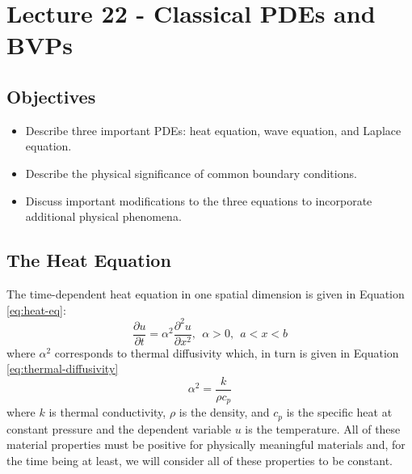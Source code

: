 \chapter{Lecture 22 - Classical PDEs and BVPs}
\label{ch:lec22}
\section{Objectives}
\begin{itemize}
\item Describe three important PDEs: heat equation, wave equation, and Laplace equation.
\item Describe the physical significance of common boundary conditions.
\item Discuss important modifications to the three equations to incorporate additional physical phenomena.
\end{itemize}

\section{The Heat Equation}
The time-dependent heat equation in one spatial dimension is given in Equation \ref{eq:heat-eq}:
\begin{equation}
\frac{\partial u}{\partial t} = \alpha^2\frac{\partial^2 u}{\partial x^2}, \ \ \alpha > 0, \ \ a<x<b
\label{eq:heat-eq}
\end{equation}
where $\alpha^2$ corresponds to thermal diffusivity which, in turn is given in Equation \ref{eq:thermal-diffusivity}
\begin{equation}
\alpha^2 = \frac{k}{\rho c_p}
\label{eq:thermal-diffusivity}
\end{equation}
where $k$ is thermal conductivity, $\rho$ is the density, and $c_p$ is the specific heat at constant pressure and the dependent variable $u$ is the temperature.  All of these material properties must be positive for physically meaningful materials and, for the time being at least, we will consider all of these properties to be constant.

